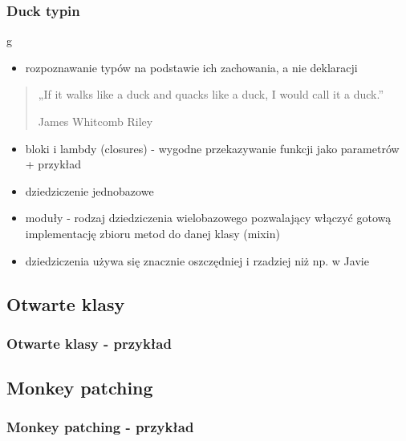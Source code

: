 \documentclass[12t]{beamer}
\begin{document}
\begin{frame}
  \frametitle{Duck typin}g
  \begin{itemize}
  \item rozpoznawanie typów na podstawie ich zachowania, a nie deklaracji
  \end{itemize}
  \begin{quote}
    „If it walks like a duck and quacks like a duck, I would call it a
    duck.”

    \hfill James Whitcomb Riley
  \end{quote}
\end{frame}

\begin{frame}
  \begin{itemize}
  \item bloki i lambdy (closures) - wygodne przekazywanie funkcji
    jako parametrów + przykład
  \end{itemize}
\end{frame}

\begin{frame}
  \begin{itemize}
  \item dziedziczenie jednobazowe
  \item moduły - rodzaj dziedziczenia wielobazowego pozwalający
    włączyć gotową implementację zbioru metod do danej klasy (mixin)
  \item dziedziczenia używa się znacznie oszczędniej i rzadziej niż
    np. w Javie
  \end{itemize}
\end{frame}

\subsection{Otwarte klasy}
\begin{frame}
  \frametitle{Otwarte klasy - przykład}
  
\end{frame}

\subsection{Monkey patching}
\begin{frame}
  \frametitle{Monkey patching - przykład}
  
\end{frame}
\end{document}
